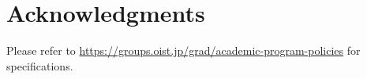 \chapter*{Acknowledgments}

Please refer to \url{https://groups.oist.jp/grad/academic-program-policies} for specifications.
